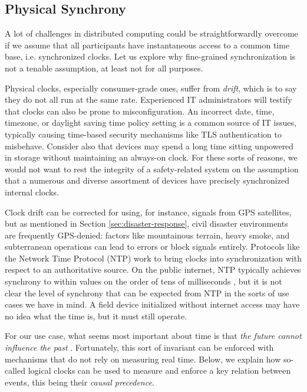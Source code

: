 \documentclass[]             %
{NASA}                       %
\theoremstyle{definition}
\begin{document}
\subsection{Physical Synchrony}
\label{ssec:physical-synchrony}
A lot of challenges in distributed computing could be
straightforwardly overcome if we assume that all participants have
instantaneous access to a common time base, i.e.  synchronized
clocks. Let us explore why fine-grained synchronization is not a
tenable assumption, at least not for all purposes.

Physical clocks, especially consumer-grade ones, suffer from
\emph{drift}, which is to say they do not all run at the same
rate. Experienced IT administrators will testify that clocks can also
be prone to misconfiguration. An incorrect date, time, timezone, or
daylight saving time policy setting is a common source of IT issues,
typically causing time-based security mechanisms like TLS
authentication to misbehave. Consider also that devices may spend a
long time sitting unpowered in storage without maintaining an
always-on clock. For these sorts of reasons, we would not want to rest
the integrity of a safety-related system on the assumption that a
numerous and diverse assortment of devices have precisely synchronized
internal clocks.

Clock drift can be corrected for using, for instance, signals from GPS
satellites, but as mentioned in Section \ref{sec:disaster-response},
civil disaster environments are frequently GPS-denied: factors like
mountainous terrain, heavy smoke, and subterranean operations can lead
to errors or block signals entirely. Protocols like the Network Time
Protocol (NTP) \cite{rfc1119} work to bring clocks into
synchronization with respect to an authoritative source. On the public
internet, NTP typically achieves synchrony to within values on the
order of tens of milliseconds \cite{rfc1128}, but it is not clear the
level of synchrony that can be expected from NTP in the sorts of use
cases we have in mind. A field device initialized without internet
access may have no idea what the time is, but it must still operate.

For our use case, what seems most important about time is that
\emph{the future cannot influence the past}
\cite{1989mattern}. Fortunately, this sort of invariant can be
enforced with mechanisms that do not rely on measuring real
time. Below, we explain how so-called logical clocks can be used to
measure and enforce a key relation between events, this being their
\emph{causal precedence}.
\end{document}

